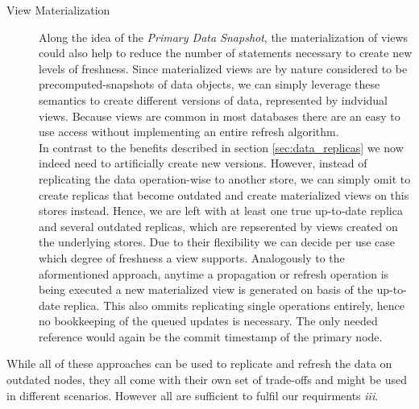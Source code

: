 \begin{description}
    \item [View Materialization]
    Along the idea of the \emph{Primary Data Snapshot}, the materialization of views could also help to reduce the number of statements necessary to create new levels of freshness.
    Since materialized views are by nature considered to be precomputed-snapshots of data objects, we can simply leverage these semantics to create different versions of data, 
    represented by indvidual views.
    Because views are common in most databases there are an easy to use access without implementing an entire refresh algorithm.\\
    In contrast to the benefits described in section \ref{sec:data_replicas} we now indeed need to artificially create new versions.
    However, instead of replicating the data operation-wise to another store, we can simply omit to create replicas that become outdated and create materialized views on this 
    stores instead. Hence, we are left with at least one true up-to-date replica and several outdated replicas, which are repserented by views created on the underlying stores.
    Due to their flexibility we can decide per use case which degree of freshness a view supports. 
    Analogously to the aformentioned approach, anytime a propagation or refresh operation is being executed a new materialized view is generated on basis of the up-to-date replica.
    This also ommits replicating single operations entirely, hence no bookkeeping of the queued updates is necessary. 
    The only needed reference would again be the commit timestamp of the primary node. 


\end{description}


While all of these approaches can be used to replicate and refresh the data on outdated nodes,
they all come with their own set of trade-offs and might be used in different scenarios.
However all are sufficient to fulfil our requirments \textit{iii}.



